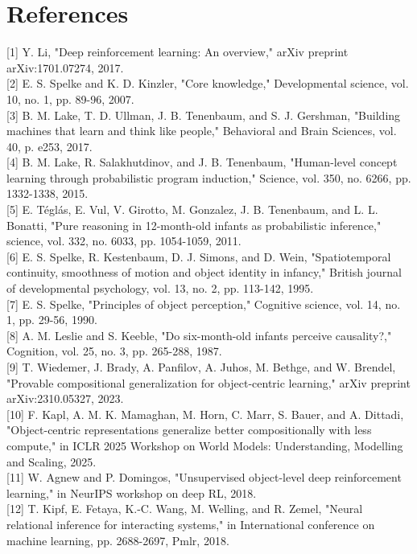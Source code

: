 \documentclass[10pt]{article}
\begin{document}
\section*{References}
[1] Y. Li, "Deep reinforcement learning: An overview," arXiv preprint arXiv:1701.07274, 2017.\\[0pt]
[2] E. S. Spelke and K. D. Kinzler, "Core knowledge," Developmental science, vol. 10, no. 1, pp. 89-96, 2007.\\[0pt]
[3] B. M. Lake, T. D. Ullman, J. B. Tenenbaum, and S. J. Gershman, "Building machines that learn and think like people," Behavioral and Brain Sciences, vol. 40, p. e253, 2017.\\[0pt]
[4] B. M. Lake, R. Salakhutdinov, and J. B. Tenenbaum, "Human-level concept learning through probabilistic program induction," Science, vol. 350, no. 6266, pp. 1332-1338, 2015.\\[0pt]
[5] E. Téglás, E. Vul, V. Girotto, M. Gonzalez, J. B. Tenenbaum, and L. L. Bonatti, "Pure reasoning in 12-month-old infants as probabilistic inference," science, vol. 332, no. 6033, pp. 1054-1059, 2011.\\[0pt]
[6] E. S. Spelke, R. Kestenbaum, D. J. Simons, and D. Wein, "Spatiotemporal continuity, smoothness of motion and object identity in infancy," British journal of developmental psychology, vol. 13, no. 2, pp. 113-142, 1995.\\[0pt]
[7] E. S. Spelke, "Principles of object perception," Cognitive science, vol. 14, no. 1, pp. 29-56, 1990.\\[0pt]
[8] A. M. Leslie and S. Keeble, "Do six-month-old infants perceive causality?," Cognition, vol. 25, no. 3, pp. 265-288, 1987.\\[0pt]
[9] T. Wiedemer, J. Brady, A. Panfilov, A. Juhos, M. Bethge, and W. Brendel, "Provable compositional generalization for object-centric learning," arXiv preprint arXiv:2310.05327, 2023.\\[0pt]
[10] F. Kapl, A. M. K. Mamaghan, M. Horn, C. Marr, S. Bauer, and A. Dittadi, "Object-centric representations generalize better compositionally with less compute," in ICLR 2025 Workshop on World Models: Understanding, Modelling and Scaling, 2025.\\[0pt]
[11] W. Agnew and P. Domingos, "Unsupervised object-level deep reinforcement learning," in NeurIPS workshop on deep RL, 2018.\\[0pt]
[12] T. Kipf, E. Fetaya, K.-C. Wang, M. Welling, and R. Zemel, "Neural relational inference for interacting systems," in International conference on machine learning, pp. 2688-2697, Pmlr, 2018.\\[0pt]
\end{document}
